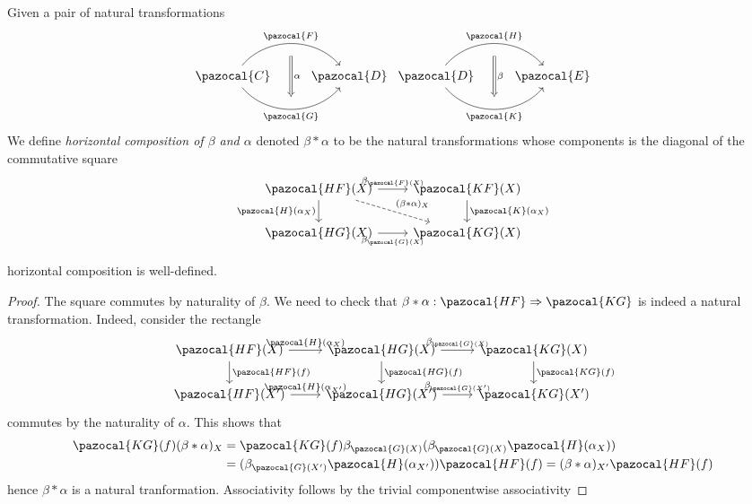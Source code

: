 \begin{definition}
    Given a pair of natural transformations
    $$
        \begin{tikzcd}
            \pazocal{C} \arrow[r,bend left = 50, "\pazocal{F}"{name=F}] \arrow[r, bend right = 50, "\pazocal{G}"{name=G},swap] & \pazocal{D}  \arrow[Rightarrow,from=F, to=G,"\alpha", shorten <= 10pt, shorten >= 10 pt]
        \end{tikzcd}
        \begin{tikzcd}
            \pazocal{D} \arrow[r,bend left = 50, "\pazocal{H}"{name=F}] \arrow[r, bend right = 50, "\pazocal{K}"{name=G},swap] & \pazocal{E}  \arrow[Rightarrow,from=F, to=G,"\beta", shorten <= 10pt, shorten >= 10 pt]
        \end{tikzcd}
    $$
    We define \emph{horizontal composition of $\beta$ and $\alpha$} denoted $\beta\ast\alpha$ to be the natural transformations whose components is the diagonal of the commutative square
    $$
        \begin{tikzcd}
            \pazocal{HF}(X) \arrow[rd, dashed, "(\beta\ast \alpha)_X"] \arrow[r,"\beta_{\pazocal{F}(X)}"] \arrow[d,"\pazocal{H}(\alpha_X)",swap] & \pazocal{KF}(X)\arrow[d,"\pazocal{K}(\alpha_X)"]\\
            \pazocal{HG}(X) \arrow[r,"\beta_{\pazocal{G}(X)}",swap] & \pazocal{KG}(X)
        \end{tikzcd}
    $$
\end{definition}
\begin{proposition}
    horizontal composition is well-defined.
\end{proposition}
\begin{proof}
    The square commutes by naturality of $\beta$. We need to check that $\beta\ast\alpha : \pazocal{HF} \Rightarrow \pazocal{KG}$ is indeed a natural transformation. Indeed, consider the rectangle 
    $$
        \begin{tikzcd}
            \pazocal{HF}(X) \arrow[d,"\pazocal{HF}(f)"]\arrow[r,"\pazocal{H}(\alpha_X)"] & \pazocal{HG}(X) \arrow[r,"\beta_{\pazocal{G}(X)}"] \arrow[d,"\pazocal{HG}(f)"] & \pazocal{KG}(X)\arrow[d,"\pazocal{KG}(f)"]\\
            \pazocal{HF}(X') \arrow[r,"\pazocal{H}(\alpha_{X'})"]& \pazocal{HG}(X') \arrow[r,"\beta_{\pazocal{G}(X')}"] & \pazocal{KG}(X')
        \end{tikzcd}
    $$ 
    commutes by the naturality of $\alpha$. This shows that 
    \begin{align*} 
        \pazocal{KG}(f)(\beta\ast\alpha)_X&=\pazocal{KG}(f)\beta_{\pazocal{G}(X)}(\beta_{\pazocal{G}(X)}\pazocal{H}(\alpha_X))\\
         &= (\beta_{\pazocal{G}(X')}\pazocal{H}(\alpha_{X'}))\pazocal{HF}(f)= (\beta\ast\alpha)_{X'}\pazocal{HF}(f)
    \end{align*}
    hence $\beta\ast \alpha$ is a natural tranformation. Associativity follows by the trivial componentwise associativity
\end{proof}
